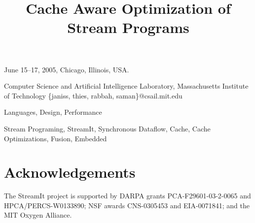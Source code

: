 \documentclass[preprint]{sigplanconf}
\begin{document}
 {June 15--17, 2005, Chicago, Illinois, USA.}

\title{Cache Aware Optimization of Stream Programs}
	     {Computer Science and Artificial Intelligence Laboratory, Massachusetts Institute of Technology}
	     {\{janiss, thies, rabbah, saman\}@csail.mit.edu}

\maketitle

\begin{abstract}

\end{abstract}


\terms 
Languages, Design, Performance

\keywords
Stream Programing, StreamIt, Synchronous Dataflow, Cache, Cache
Optimizations, Fusion, Embedded










\section*{Acknowledgements}
The StreamIt project is
supported by DARPA grants PCA-F29601-03-2-0065 and
HPCA/PERCS-W0133890; NSF awards CNS-0305453 and EIA-0071841; and the
MIT Oxygen Alliance.




\clearpage
\end{document}
